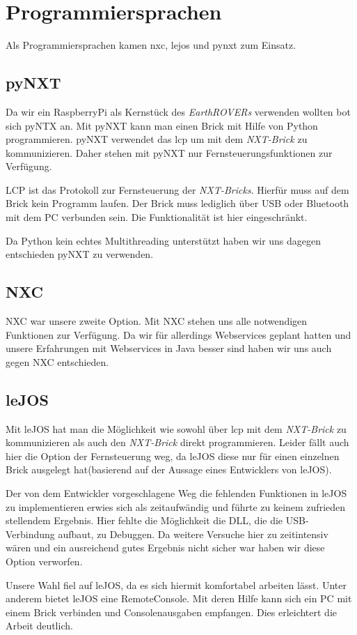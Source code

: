 \chapter{Programmiersprachen}
Als Programmiersprachen kamen \gls{nxc}, \gls{lejos} und \gls{pynxt} zum Einsatz. 

\section{pyNXT}
Da wir ein RaspberryPi als Kernstück des \textit{EarthROVERs} verwenden wollten bot sich pyNTX an. Mit pyNXT kann man einen Brick mit Hilfe von Python programmieren. pyNXT verwendet das \gls{lcp} um mit dem \textit{NXT-Brick} zu kommunizieren. Daher stehen mit pyNXT nur Fernsteuerungsfunktionen zur Verfügung.

LCP ist das Protokoll zur Fernsteuerung der \textit{NXT-Bricks}. Hierfür muss auf dem Brick kein Programm laufen. Der Brick muss lediglich über USB oder Bluetooth mit dem PC verbunden sein. Die Funktionalität ist hier eingeschränkt.

Da Python kein echtes Multithreading unterstützt haben wir uns dagegen entschieden pyNXT zu verwenden.

\section{NXC}
NXC war unsere zweite Option. Mit NXC stehen uns alle notwendigen Funktionen zur Verfügung. Da wir für allerdings Webservices geplant hatten und unsere Erfahrungen mit Webservices in Java besser sind haben wir uns auch gegen NXC entschieden.

\section{leJOS}
Mit leJOS hat man die Möglichkeit wie sowohl über \gls{lcp} mit dem \textit{NXT-Brick} zu kommunizieren als auch den \textit{NXT-Brick} direkt programmieren. Leider fällt auch hier die Option der Fernsteuerung weg, da leJOS diese nur für einen einzelnen Brick ausgelegt hat(basierend auf der Aussage eines Entwicklers von leJOS). 

Der von dem Entwickler vorgeschlagene Weg die fehlenden Funktionen in leJOS zu implementieren erwies sich als zeitaufwändig und führte zu keinem zufrieden stellendem Ergebnis. Hier fehlte die Möglichkeit die DLL, die die USB-Verbindung aufbaut, zu Debuggen. Da weitere Versuche hier zu zeitintensiv wären und ein ausreichend gutes Ergebnis nicht sicher war haben wir diese Option verworfen.  

 Unsere Wahl fiel auf leJOS, da es sich hiermit komfortabel arbeiten lässt. Unter anderem bietet leJOS eine RemoteConsole. Mit deren Hilfe kann sich ein PC mit einem Brick verbinden und Consolenausgaben empfangen. Dies erleichtert die Arbeit deutlich.
